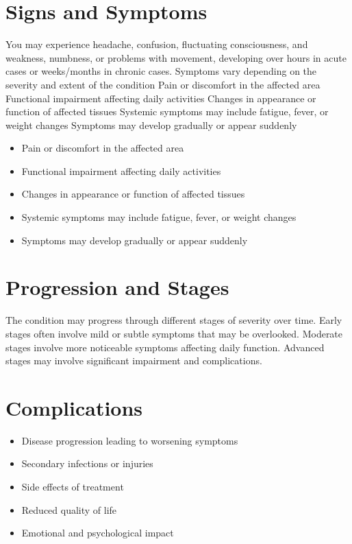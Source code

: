 \section{Signs and Symptoms}
You may experience headache, confusion, fluctuating consciousness, and weakness, numbness, or problems with movement, developing over hours in acute cases or weeks/months in chronic cases. Symptoms vary depending on the severity and extent of the condition Pain or discomfort in the affected area Functional impairment affecting daily activities Changes in appearance or function of affected tissues Systemic symptoms may include fatigue, fever, or weight changes Symptoms may develop gradually or appear suddenly

\begin{itemize}[noitemsep]
  \item Pain or discomfort in the affected area
  \item Functional impairment affecting daily activities
  \item Changes in appearance or function of affected tissues
  \item Systemic symptoms may include fatigue, fever, or weight changes
  \item Symptoms may develop gradually or appear suddenly
\end{itemize}
\section{Progression and Stages}
The condition may progress through different stages of severity over time. Early stages often involve mild or subtle symptoms that may be overlooked. Moderate stages involve more noticeable symptoms affecting daily function. Advanced stages may involve significant impairment and complications.
\section{Complications}
\begin{itemize}[noitemsep]
  \item Disease progression leading to worsening symptoms
  \item Secondary infections or injuries
  \item Side effects of treatment
  \item Reduced quality of life
  \item Emotional and psychological impact
\end{itemize}
